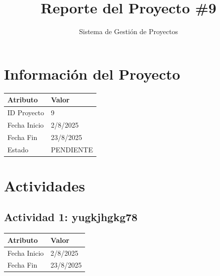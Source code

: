\documentclass{article}
\title{Reporte del Proyecto \#9}
\author{Sistema de Gestión de Proyectos}
\date{}
\begin{document}
\maketitle

\section*{Información del Proyecto}
\begin{tabular}{|l|l|}
\hline
\rowcolor{lightgray} \textbf{Atributo} & \textbf{Valor} \\
\hline
ID Proyecto & 9 \\
\hline
Fecha Inicio & 2/8/2025 \\
\hline
Fecha Fin & 23/8/2025 \\
\hline
Estado & PENDIENTE \\
\hline
\end{tabular}

\vspace{1cm}

\section*{Actividades}

\subsection*{Actividad 1: yugkjhgkg78}
\begin{tabular}{|l|l|}
\hline
\rowcolor{lightgray} \textbf{Atributo} & \textbf{Valor} \\
\hline
Fecha Inicio & 2/8/2025 \\
\hline
Fecha Fin & 23/8/2025 \\
\hline
\end{tabular}

\vspace{0.5cm}
\end{document}

